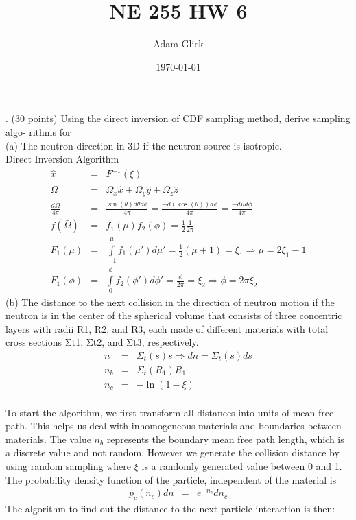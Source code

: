 \documentclass{article}
\date{\today}
\author{Adam Glick}
\title{NE 255 HW 6}
\begin{document}
\maketitle
{}. (30 points) Using the direct inversion of CDF sampling method, derive sampling algo- rithms for\\
\newline
(a) The neutron direction in 3D if the neutron source is isotropic.\\
\newline
Direct Inversion Algorithm\\
\newline
\begin{eqnarray}
\hat{x} &=& F^{-1} (\xi)\\
\bar{\Omega} &=& \Omega _x \hat{x} + \Omega _y \hat{y} + \Omega _z \hat{z}\\
\frac{d \Omega}{4\pi} &=& \frac{\sin (\theta) d\theta d\phi}{4 \pi} = \frac{-d(\cos (\theta)) d\phi}{4 \pi} = \frac{-d \mu d\phi}{4\pi}\\
f(\bar{\Omega}) &=& f_1 (\mu) f_2 (\phi) = \frac{1}{2} \frac{1}{2\pi}\\
F_1 (\mu) &=& \int\limits _{-1}^{\mu} f_1 (\mu ') d \mu ' = \frac{1}{2} (\mu + 1) = \xi _1 \Longrightarrow \boxed{ \mu = 2 \xi _1 - 1}\\
F_1 (\phi) &=& \int\limits _0^{\phi} f_2 (\phi ') d\phi ' = \frac{\phi}{2 \pi} = \xi _2 \Longrightarrow \boxed{ \phi = 2\pi \xi _2 }
\end{eqnarray}
\newline
(b) The distance to the next collision in the direction of neutron motion if the neutron is in the center of the spherical volume that consists of three concentric layers with radii R1, R2, and R3, each made of different materials with total cross sections Σt1, Σt2, and Σt3, respectively.\\
\newline
\begin{eqnarray}
n &=& \Sigma _t (s) s \Longrightarrow dn = \Sigma _t (s) ds\\
n_b &=& \Sigma _t (R_1) R_1\\
n_c &=& -\ln (1 - \xi )
\end{eqnarray} \\
To start the algorithm, we first transform all distances into units of mean free path. This helps us deal with inhomogeneous materials and boundaries between materials. The value $n_b$ represents the boundary mean free path length, which is a discrete value and not random. However we generate the collision distance by using random sampling where $\xi$ is a randomly generated value between 0 and 1. The probability density function of the particle, independent of the material is\\
\begin{eqnarray}
p _c (n_c) dn &=& e^{-n_c} dn_c
\end{eqnarray}
The algorithm to find out the distance to the next particle interaction is then:\\
\newline
\end{document}
